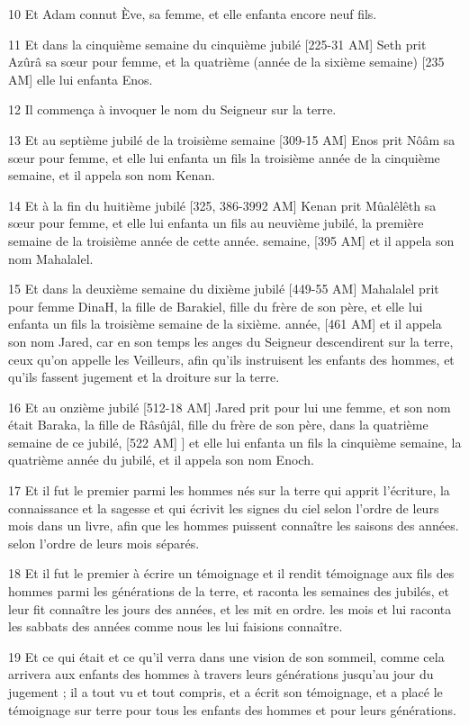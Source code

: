 \par 10 Et Adam connut Ève, sa femme, et elle enfanta encore neuf fils.
\par 11 Et dans la cinquième semaine du cinquième jubilé [225-31 AM] Seth prit Azûrâ sa sœur pour femme, et la quatrième (année de la sixième semaine) [235 AM] elle lui enfanta Enos.
\par 12 Il commença à invoquer le nom du Seigneur sur la terre.
\par 13 Et au septième jubilé de la troisième semaine [309-15 AM] Enos prit Nôâm sa sœur pour femme, et elle lui enfanta un fils la troisième année de la cinquième semaine, et il appela son nom Kenan.
\par 14 Et à la fin du huitième jubilé [325, 386-3992 AM] Kenan prit Mûalêlêth sa sœur pour femme, et elle lui enfanta un fils au neuvième jubilé, la première semaine de la troisième année de cette année. semaine, [395 AM] et il appela son nom Mahalalel.
\par 15 Et dans la deuxième semaine du dixième jubilé [449-55 AM] Mahalalel prit pour femme DinaH, la fille de Barakiel, fille du frère de son père, et elle lui enfanta un fils la troisième semaine de la sixième. année, [461 AM] et il appela son nom Jared, car en son temps les anges du Seigneur descendirent sur la terre, ceux qu'on appelle les Veilleurs, afin qu'ils instruisent les enfants des hommes, et qu'ils fassent jugement et la droiture sur la terre.
\par 16 Et au onzième jubilé [512-18 AM] Jared prit pour lui une femme, et son nom était Baraka, la fille de Râsûjâl, fille du frère de son père, dans la quatrième semaine de ce jubilé, [522 AM] ] et elle lui enfanta un fils la cinquième semaine, la quatrième année du jubilé, et il appela son nom Enoch.
\par 17 Et il fut le premier parmi les hommes nés sur la terre qui apprit l'écriture, la connaissance et la sagesse et qui écrivit les signes du ciel selon l'ordre de leurs mois dans un livre, afin que les hommes puissent connaître les saisons des années. selon l'ordre de leurs mois séparés.
\par 18 Et il fut le premier à écrire un témoignage et il rendit témoignage aux fils des hommes parmi les générations de la terre, et raconta les semaines des jubilés, et leur fit connaître les jours des années, et les mit en ordre. les mois et lui raconta les sabbats des années comme nous les lui faisions connaître.
\par 19 Et ce qui était et ce qu'il verra dans une vision de son sommeil, comme cela arrivera aux enfants des hommes à travers leurs générations jusqu'au jour du jugement ; il a tout vu et tout compris, et a écrit son témoignage, et a placé le témoignage sur terre pour tous les enfants des hommes et pour leurs générations.
